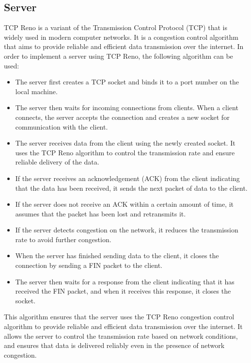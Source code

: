 \documentclass[11pt]{article}
\begin{document}
\subsection{Server}
TCP Reno is a variant of the Transmission Control Protocol (TCP) that is widely used in modern computer networks. It is a congestion control algorithm that aims to provide reliable and efficient data transmission over the internet. In order to implement a server using TCP Reno, the following algorithm can be used:
\begin{itemize}
\item The server first creates a TCP socket and binds it to a port number on the local machine.

\item The server then waits for incoming connections from clients. When a client connects, the server accepts the connection and creates a new socket for communication with the client.

\item The server receives data from the client using the newly created socket. It uses the TCP Reno algorithm to control the transmission rate and ensure reliable delivery of the data.

\item If the server receives an acknowledgement (ACK) from the client indicating that the data has been received, it sends the next packet of data to the client.

\item If the server does not receive an ACK within a certain amount of time, it assumes that the packet has been lost and retransmits it.

\item If the server detects congestion on the network, it reduces the transmission rate to avoid further congestion.

\item When the server has finished sending data to the client, it closes the connection by sending a FIN packet to the client.

\item The server then waits for a response from the client indicating that it has received the FIN packet, and when it receives this response, it closes the socket.
\end{itemize}
This algorithm ensures that the server uses the TCP Reno congestion control algorithm to provide reliable and efficient data transmission over the internet. It allows the server to control the transmission rate based on network conditions, and ensures that data is delivered reliably even in the presence of network congestion.
\end{document}

